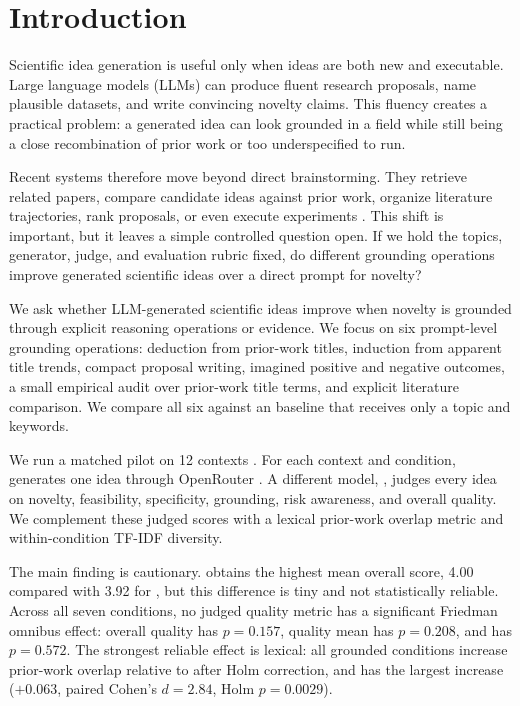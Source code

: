 \section{Introduction}
\label{sec:introduction}

Scientific idea generation is useful only when ideas are both new and executable. Large language models (LLMs) can produce fluent research proposals, name plausible datasets, and write convincing novelty claims. This fluency creates a practical problem: a generated idea can look grounded in a field while still being a close recombination of prior work or too underspecified to run.

Recent systems therefore move beyond direct brainstorming. They retrieve related papers, compare candidate ideas against prior work, organize literature trajectories, rank proposals, or even execute experiments \citep{wang2024scimon,baek2024researchagent,wang2024scipip,li2024chain,lu2024aiscientist}. This shift is important, but it leaves a simple controlled question open. If we hold the topics, generator, judge, and evaluation rubric fixed, do different grounding operations improve generated scientific ideas over a direct prompt for novelty?

 We ask whether LLM-generated scientific ideas improve when novelty is grounded through explicit reasoning operations or evidence. We focus on six prompt-level grounding operations: deduction from prior-work titles, induction from apparent title trends, compact proposal writing, imagined positive and negative outcomes, a small empirical audit over prior-work title terms, and explicit literature comparison. We compare all six against an \ungrounded baseline that receives only a topic and keywords.

We run a matched pilot on 12 \aibidea contexts \citep{qiu2025aiideabench}. For each context and condition, \gptmini generates one idea through OpenRouter \citep{openrouter2026api}. A different model, \geminiflash, judges every idea on novelty, feasibility, specificity, grounding, risk awareness, and overall quality. We complement these judged scores with a lexical prior-work overlap metric and within-condition TF-IDF diversity.

The main finding is cautionary. \litcompare obtains the highest mean overall score, 4.00 compared with 3.92 for \ungrounded, but this difference is tiny and not statistically reliable. Across all seven conditions, no judged quality metric has a significant Friedman omnibus effect: overall quality has $p=0.157$, quality mean has $p=0.208$, and \nfprod has $p=0.572$. The strongest reliable effect is lexical: all grounded conditions increase prior-work overlap relative to \ungrounded after Holm correction, and \litcompare has the largest increase ($+0.063$, paired Cohen's $d=2.84$, Holm $p=0.0029$).

